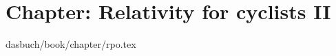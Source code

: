 %
%
%
%
%

%
%
%
%
%
%
\section{Chapter: Relativity for cyclists II}
\label{c-rpo}\noindent dasbuch/book/chapter/rpo.tex

